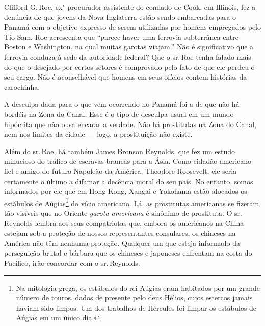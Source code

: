 Clifford G.\,Roe, ex"-procurador assistente do condado de Cook, em
Illinois, fez a denúncia de que jovens da Nova Inglaterra estão sendo
embarcadas para o Panamá com o objetivo expresso de serem
utilizadas por homens empregados pelo Tio Sam. Roe acrescenta que
``parece haver uma ferrovia subterrânea entre Boston e Washington, na
qual muitas garotas viajam.'' Não é significativo que a ferrovia conduza
à sede da autoridade federal? Que o sr.\,Roe tenha falado mais do que o
desejado por certos setores é comprovado pelo fato de que ele perdeu o seu
cargo. Não é aconselhável que homens em seus ofícios contem histórias da
carochinha.

A desculpa dada para o que vem ocorrendo no Panamá foi a de que não há
bordéis na Zona do Canal. Esse é o tipo de desculpa usual em um mundo
hipócrita que não ousa encarar a verdade. Não há prostitutas na Zona do
Canal, nem nos limites da cidade --- logo, a prostituição não existe.

Além do sr.\,Roe, há também James Bronson Reynolds, que fez um estudo
minucioso do tráfico de escravas brancas para a Ásia. Como cidadão
americano fiel e amigo do futuro Napoleão da América, Theodore
Roosevelt, ele seria certamente o último a difamar a decência moral do
seu país. No entanto, somos informados por ele que em Hong Kong, Xangai e
Yokohama estão alocados os estábulos de Aúgias\footnote{Na
  mitologia grega, os estábulos do rei Aúgias eram habitados por um
  grande número de touros, dados de presente pelo deus Hélios, cujos
  estercos jamais haviam sido limpos. Um dos trabalhos de Hércules foi
  limpar os estábulos de Aúgias em um único dia.} do vício americano. Lá,
as prostitutas americanas se fizeram tão visíveis que no Oriente
\textit{garota americana} é sinônimo de prostituta. O sr.\,Reynolds lembra aos
seus compatriotas que, embora os americanos na China estejam sob a
proteção de nossos representantes consulares, os chineses na América não
têm nenhuma proteção. Qualquer um que esteja informado da perseguição
brutal e bárbara que os chineses e japoneses enfrentam na costa do
Pacífico, irão concordar com o sr.\,Reynolds.

